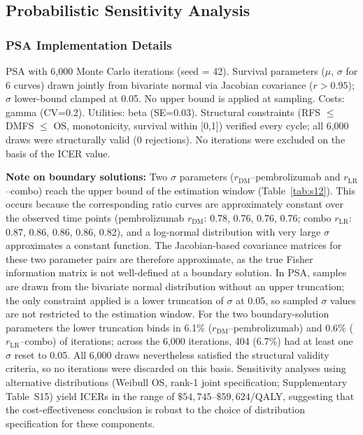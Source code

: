 \documentclass[11pt,a4paper]{article}
\begin{document}
\subsection{Probabilistic Sensitivity Analysis}
\label{sec:psa}

\subsubsection{PSA Implementation Details}
PSA with 6,000 Monte Carlo iterations (seed = 42). Survival parameters ($\mu$, $\sigma$ for 6 curves) drawn jointly from bivariate normal via Jacobian covariance ($r > 0.95$); $\sigma$ lower-bound clamped at 0.05. No upper bound is applied at sampling. Costs: gamma (CV=0.2). Utilities: beta (SE=0.03). Structural constraints (RFS $\leq$ DMFS $\leq$ OS, monotonicity, survival within [0,1]) verified every cycle; all 6,000 draws were structurally valid (0 rejections). No iterations were excluded on the basis of the ICER value.

\noindent\textbf{Note on boundary solutions:} Two $\sigma$ parameters ($r_{\text{DM}}$--pembrolizumab and $r_{\text{LR}}$--combo) reach the upper bound of the estimation window (Table~\ref{tab:s12}). This occurs because the corresponding ratio curves are approximately constant over the observed time points (pembrolizumab $r_{\text{DM}}$: 0.78, 0.76, 0.76, 0.76; combo $r_{\text{LR}}$: 0.87, 0.86, 0.86, 0.86, 0.82), and a log-normal distribution with very large $\sigma$ approximates a constant function. The Jacobian-based covariance matrices for these two parameter pairs are therefore approximate, as the true Fisher information matrix is not well-defined at a boundary solution. In PSA, samples are drawn from the bivariate normal distribution without an upper truncation; the only constraint applied is a lower truncation of $\sigma$ at 0.05, so sampled $\sigma$ values are not restricted to the estimation window. For the two boundary-solution parameters the lower truncation binds in 6.1\% ($r_{\text{DM}}$--pembrolizumab) and 0.6\% ($r_{\text{LR}}$--combo) of iterations; across the 6,000 iterations, 404 (6.7\%) had at least one $\sigma$ reset to 0.05. All 6,000 draws nevertheless satisfied the structural validity criteria, so no iterations were discarded on this basis. Sensitivity analyses using alternative distributions (Weibull OS, rank-1 joint specification; Supplementary Table~S15) yield ICERs in the range of $\$54,745$--$\$59,624$/QALY, suggesting that the cost-effectiveness conclusion is robust to the choice of distribution specification for these components.
\end{document}
